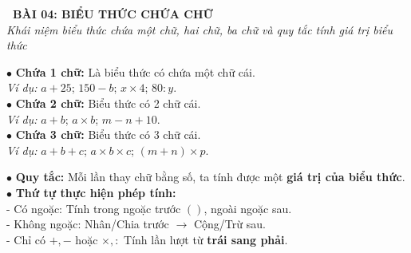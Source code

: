 \documentclass[14pt,a4paper,oneside]{extbook}
\begin{document}
\noindent
\begin{tcolorbox}[
  enhanced,
  colback=teal!8!white,
  colframe=teal!80!black,
  arc=3mm, boxrule=1pt,
  left=3mm, right=3mm, top=2mm, bottom=2mm,
  halign=center
]
  {\Large\bfseries\color{teal!90!black}\faBookmark\ BÀI 04: BIỂU THỨC CHỨA CHỮ}\\[1.5pt]
  {\footnotesize\itshape\color{black!75} Khái niệm biểu thức chứa một chữ, hai chữ, ba chữ và quy tắc tính giá trị biểu thức}
\end{tcolorbox}

\vspace{2.5mm}

\noindent
\begin{minipage}[t]{0.49\textwidth}
  \begin{tcolorbox}[
    enhanced,
    title={\footnotesize\bfseries\color{white}\faFont\ 1. Khái niệm Biểu thức chứa chữ},
    colback=blue!2!white,
    colframe=blue!75!black,
    arc=2.5mm, boxrule=0.8pt, top=1.8mm, bottom=1.8mm, left=2mm, right=2mm
  ]
    \footnotesize
    $\bullet$ \textbf{Chứa 1 chữ:} Là biểu thức có chứa một chữ cái.\\
    \textit{Ví dụ:} $a + 25$; $150 - b$; $x \times 4$; $80 : y$.\\
    $\bullet$ \textbf{Chứa 2 chữ:} Biểu thức có 2 chữ cái.\\
    \textit{Ví dụ:} $a + b$; $a \times b$; $m - n + 10$.\\
    $\bullet$ \textbf{Chứa 3 chữ:} Biểu thức có 3 chữ cái.\\
    \textit{Ví dụ:} $a + b + c$; $a \times b \times c$; $(m + n) \times p$.
  \end{tcolorbox}
\end{minipage}%
\hfill
\begin{minipage}[t]{0.49\textwidth}
  \begin{tcolorbox}[
    enhanced,
    title={\footnotesize\bfseries\color{white}\faCalculator\ 2. Tính giá trị của biểu thức},
    colback=teal!2!white,
    colframe=teal!75!black,
    arc=2.5mm, boxrule=0.8pt, top=1.8mm, bottom=1.8mm, left=2mm, right=2mm
  ]
    \footnotesize
    $\bullet$ \textbf{Quy tắc:} Mỗi lần thay chữ bằng số, ta tính được một \textbf{giá trị của biểu thức}.\\
    $\bullet$ \textbf{Thứ tự thực hiện phép tính:}\\
    - Có ngoặc: Tính trong ngoặc trước $( )$, ngoài ngoặc sau.\\
    - Không ngoặc: Nhân/Chia trước $\rightarrow$ Cộng/Trừ sau.\\
    - Chỉ có $+,-$ hoặc $\times,:$ Tính lần lượt từ \textbf{trái sang phải}.
  \end{tcolorbox}
\end{minipage}
\end{document}
